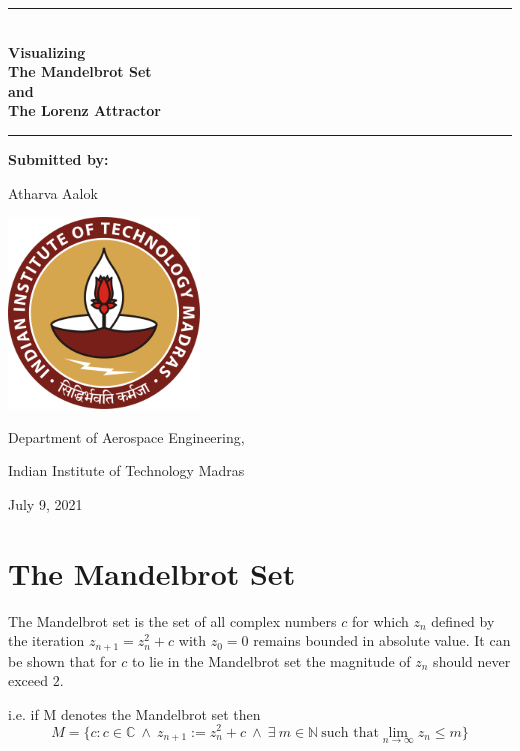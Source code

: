 \documentclass[14pts]{article}
\begin{document}
    \begin{titlepage}
        \begin{center}
            \rule{\textwidth}{1pt}\\
            \Huge
            \textbf{Visualizing \\ The Mandelbrot Set \\ and \\ The Lorenz Attractor }\\
            \rule{\textwidth}{1pt}
            \vfill
            
            \Large
            \textbf{Submitted by:}
            \medskip

            Atharva Aalok
            \vfill

            \includegraphics[width = 2in]{Images/IITM_logo.svg.png}
            \vfill

            Department of Aerospace Engineering,
            \medskip

            Indian Institute of Technology Madras
            \vfill

            July 9, 2021

        \end{center}
    \end{titlepage}


    \renewcommand*\contentsname{\huge Summary}
    \large
    \tableofcontents
    \normalsize

    \pagebreak
    \huge
    \section{The Mandelbrot Set}
    \normalsize
    The Mandelbrot set is the set of all complex numbers $ c $ for which $z_{n}$ defined by the iteration $ z_{n+1} = z_{n}^2 + c $ with $ z_{0} = 0 $ remains bounded in absolute value.
    It can be shown that for $ c $ to lie in the Mandelbrot set the magnitude of $ z_{n} $ should never exceed $ 2 $.

    i.e. if M denotes the Mandelbrot set then
    \[ M = \{c : c \in \mathbb{C} \ \land \ z_{n+1}:=z_{n}^2 + c \ \land \ \exists \ m \in \mathbb{N} \ \text{such that} \lim_{n \to \infty} z_{n} \leq m \} \]
\end{document}
